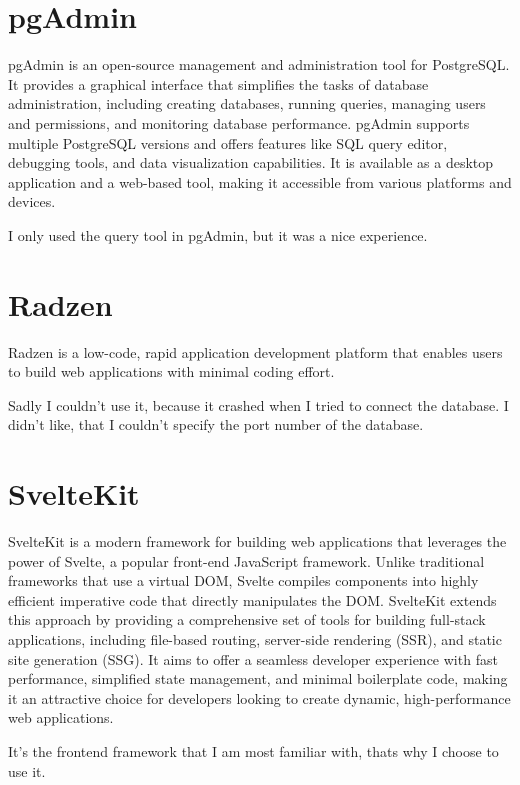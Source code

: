 \documentclass[12pt]{report}
\begin{document}
\section{pgAdmin}

pgAdmin is an open-source management and administration tool for PostgreSQL. It provides a graphical interface that simplifies the tasks of database administration, including creating databases, running queries, managing users and permissions, and monitoring database performance. pgAdmin supports multiple PostgreSQL versions and offers features like SQL query editor, debugging tools, and data visualization capabilities. It is available as a desktop application and a web-based tool, making it accessible from various platforms and devices.

I only used the query tool in pgAdmin, but it was a nice experience.

\section{Radzen}

Radzen is a low-code, rapid application development platform that enables users to build web applications with minimal coding effort.

Sadly I couldn't use it, because it crashed when I tried to connect the database. I didn't like, that I couldn't specify the port number of the database.

\section{SvelteKit}

SvelteKit is a modern framework for building web applications that leverages the power of Svelte, a popular front-end JavaScript framework. Unlike traditional frameworks that use a virtual DOM, Svelte compiles components into highly efficient imperative code that directly manipulates the DOM. SvelteKit extends this approach by providing a comprehensive set of tools for building full-stack applications, including file-based routing, server-side rendering (SSR), and static site generation (SSG). It aims to offer a seamless developer experience with fast performance, simplified state management, and minimal boilerplate code, making it an attractive choice for developers looking to create dynamic, high-performance web applications.

It's the frontend framework that I am most familiar with, thats why I choose to use it.
\end{document}
